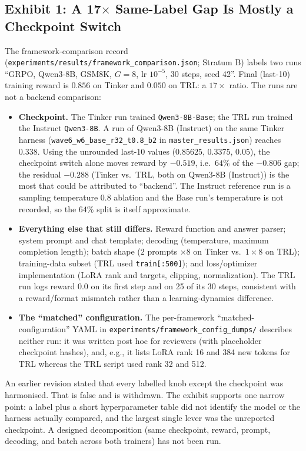 \subsection{Exhibit 1: A \texorpdfstring{17$\times$}{17x} Same-Label Gap Is Mostly a Checkpoint Switch}
\label{sec:p5-exhibit-backend}
The framework-comparison record (\texttt{experiments/results/framework\_comparison.json};
Stratum B) labels two runs ``GRPO, Qwen3-8B, GSM8K, $G{=}8$, lr $10^{-5}$,
30 steps, seed 42''. Final (last-10) training reward is $0.856$ on Tinker and
$0.050$ on TRL: a $17\times$ ratio. The runs are not a backend comparison:
\begin{itemize}
  \item \textbf{Checkpoint.} The Tinker run trained \texttt{Qwen3-8B-Base};
    the TRL run trained the Instruct \texttt{Qwen3-8B}. A run of Qwen3-8B (Instruct) on the same
    Tinker harness
    (\texttt{wave6\_w6\_base\_r32\_t0.8\_b2} in \texttt{master\_results.json})
    reaches $0.338$. Using the unrounded last-10 values ($0.85625$, $0.3375$,
    $0.05$), the checkpoint switch alone moves reward by
    $-0.519$, i.e.\ $64\%$ of the $-0.806$ gap; the residual $-0.288$
    (Tinker vs.\ TRL, both on Qwen3-8B (Instruct)) is the most that could be
    attributed to ``backend''. The Instruct reference run is a sampling
    temperature $0.8$ ablation and the Base run's temperature is not
    recorded, so the $64\%$ split is itself approximate.
  \item \textbf{Everything else that still differs.} Reward function and
    answer parser; system prompt and chat template; decoding (temperature,
    maximum completion length); batch shape ($2$ prompts $\times 8$ on Tinker
    vs.\ $1\times8$ on TRL); training-data subset (TRL used
    \texttt{train[:500]}); and loss/optimizer implementation (LoRA rank and
    targets, clipping, normalization). The TRL run logs reward $0.0$ on its
    first step and on 25 of its 30 steps, consistent with a reward/format
    mismatch rather than a learning-dynamics difference.
  \item \textbf{The ``matched'' configuration.} The per-framework
    ``matched-configuration'' YAML in \texttt{experiments/framework\_config\_dumps/}
    describes neither run: it was written post hoc for reviewers (with
    placeholder checkpoint hashes), and, e.g., it lists LoRA rank 16 and 384
    new tokens for TRL whereas the TRL script used rank 32 and 512.
\end{itemize}
An earlier revision stated that every labelled knob except the checkpoint was
harmonised. That is false and is withdrawn. The exhibit supports one narrow
point: a label plus a short hyperparameter table did not identify the model or
the harness actually compared, and the largest single lever was the
unreported checkpoint. A designed decomposition (same checkpoint, reward,
prompt, decoding, and batch across both trainers) has not been run.

